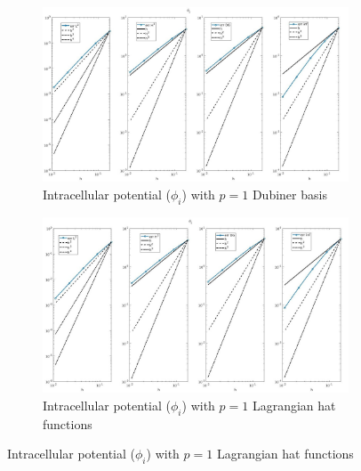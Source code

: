 \documentclass[a4paper,11pt]{article}
\begin{document}
\begin{figure}[H] 
	\caption{Comparison of the intracellular potential ($\phi_i$)}
	\label{Phii_1_mean}
	\begin{subfigure}{\textwidth}
		\begin{center}
			\includegraphics[width = \textwidth]{./errors/D1_Phii_2.jpg}
			\caption{Intracellular potential ($\phi_i$) with $p=1$ Dubiner basis}
		\end{center}
	\end{subfigure}
	\begin{subfigure}{\textwidth}
		\begin{center}
			\includegraphics[width =\textwidth]{./errors/P1_Phii_2.jpg}
			\caption{Intracellular potential ($\phi_i$) with $p=1$ Lagrangian hat functions}
		\end{center}
	\end{subfigure}
\end{figure}
\end{document}
